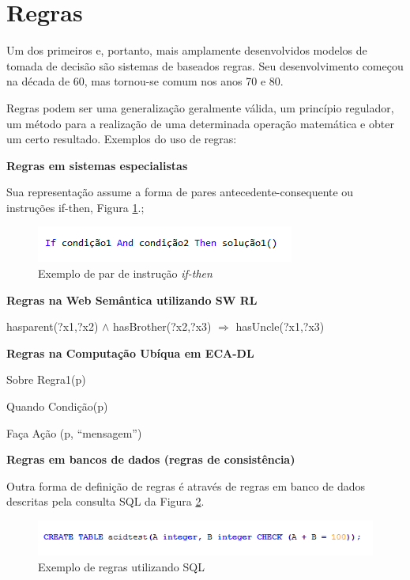 \documentclass[12pt,a4paper,compsoc]{IEEEtran}
\begin{document}
\section{Regras}

  Um dos primeiros e, portanto, mais amplamente desenvolvidos modelos de tomada de decisão são
  sistemas de baseados regras. Seu  desenvolvimento começou na década de 60, mas tornou-se comum
  nos anos 70 e 80.
  
  Regras podem ser  uma generalização geralmente válida, um princípio regulador, um método para a
  realização de uma determinada operação matemática e obter um certo resultado. Exemplos do uso de
  regras:
  
  \textbf{Regras em sistemas especialistas}

  Sua representação assume a forma de pares antecedente-consequente ou instruções if-then, Figura
  \ref{if-then}.;

  \begin{figure}[ht]
    \centerline{\includegraphics[scale=1]{imagens/if_then.png}}
    \caption{Exemplo de par de instrução \textit{if-then}}
    \label{if-then}
  \end{figure}
  
  \textbf{Regras na Web Semântica utilizando SW RL}
  
  hasparent(?x1,?x2) $\wedge$ hasBrother(?x2,?x3) $\Rightarrow$ hasUncle(?x1,?x3)

  \textbf{Regras na Computação Ubíqua em ECA-DL}

  Sobre Regra1(p)
  
  Quando Condição(p)
  
  Faça Ação (p, ``mensagem'')


  \textbf{Regras em bancos de dados (regras de consistência)}
  
  Outra forma de definição de regras é através de regras em banco de dados descritas pela consulta SQL
  da Figura \ref{create-table}.
  
  \begin{figure}[ht]
    \centerline{\includegraphics[scale=.6]{imagens/acidtest.png}}
    \caption{Exemplo de regras utilizando SQL}
    \label{create-table}
  \end{figure}
\end{document}
